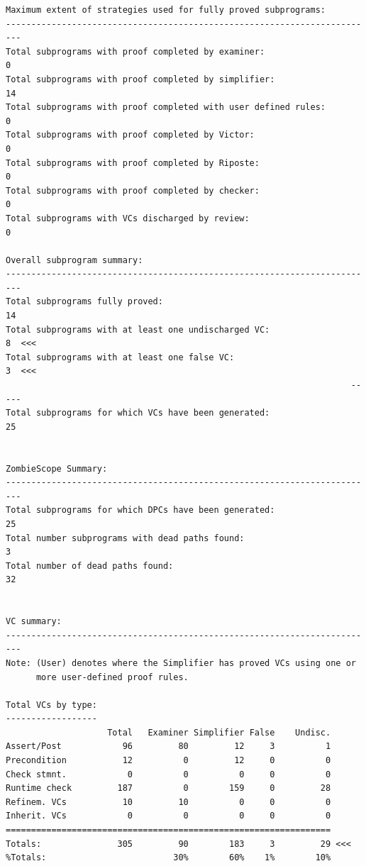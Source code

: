 \begin{lstlisting}[frame=single, gobble=0, caption={Summary of POGS report for PCA Pump prototype}]
Maximum extent of strategies used for fully proved subprograms:
-------------------------------------------------------------------------
Total subprograms with proof completed by examiner:                     0
Total subprograms with proof completed by simplifier:                  14
Total subprograms with proof completed with user defined rules:         0
Total subprograms with proof completed by Victor:                       0
Total subprograms with proof completed by Riposte:                      0
Total subprograms with proof completed by checker:                      0
Total subprograms with VCs discharged by review:                        0

Overall subprogram summary:
-------------------------------------------------------------------------
Total subprograms fully proved:                                        14
Total subprograms with at least one undischarged VC:                    8  <<<
Total subprograms with at least one false VC:                           3  <<<
                                                                    -----
Total subprograms for which VCs have been generated:                   25


ZombieScope Summary:
-------------------------------------------------------------------------
Total subprograms for which DPCs have been generated:                  25
Total number subprograms with dead paths found:                         3
Total number of dead paths found:                                      32


VC summary:
-------------------------------------------------------------------------
Note: (User) denotes where the Simplifier has proved VCs using one or
      more user-defined proof rules.

Total VCs by type:
------------------
                    Total   Examiner Simplifier False    Undisc.
Assert/Post            96         80         12     3          1
Precondition           12          0         12     0          0
Check stmnt.            0          0          0     0          0
Runtime check         187          0        159     0         28
Refinem. VCs           10         10          0     0          0
Inherit. VCs            0          0          0     0          0
================================================================
Totals:               305         90        183     3         29 <<<
%Totals:                         30%        60%    1%        10%
\end{lstlisting}
\label{listing:pca_ravenscar:pogs}
\doublespacing



